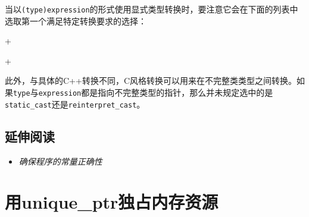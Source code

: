 
当以\texttt{(\allowbreak{}type)\allowbreak{}expression}的形式使用显式类型转换时，要注意它会在下面的列表中选取第一个满足特定转换要求的选择：









 + 






 +






此外，与具体的C++转换不同，C风格转换可以用来在不完整类类型之间转换。如果\texttt{type}与\texttt{expression}都是指向不完整类型的指针，那么并未规定选中的是\texttt{static\_\allowbreak{}cast}还是\texttt{reinterpret\_\allowbreak{}cast}。



\subsection{延伸阅读}



\begin{itemize}
\item \textit{确保程序的常量正确性}

\end{itemize}



\section{用unique\_ptr独占内存资源}



